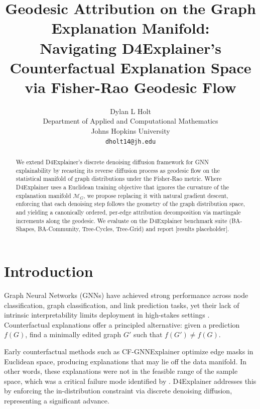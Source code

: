\documentclass[11pt]{article}
\title{Geodesic Attribution on the Graph Explanation Manifold:\\
  Navigating D4Explainer's Counterfactual Explanation Space\\
  via Fisher-Rao Geodesic Flow}
\author{Dylan L Holt\\
  \small Department of Applied and Computational Mathematics\\
  \small Johns Hopkins University\\
  \small \texttt{dholt14@jh.edu}}
\date{}
\newcommand{\MG}{\mathcal{M}_G}
\begin{document}
\maketitle

\begin{abstract}
We extend D4Explainer's discrete denoising diffusion framework for GNN
explainability by recasting its reverse diffusion process as geodesic
flow on the statistical manifold of graph distributions under the
Fisher-Rao metric. Where D4Explainer uses a Euclidean training objective
that ignores the curvature of the explanation manifold $\MG$, we propose
replacing it with natural gradient descent, enforcing that each
denoising step follows the geometry of the graph distribution space,
and yielding a canonically ordered, per-edge attribution decomposition
via martingale increments along the geodesic. We evaluate on the
D4Explainer benchmark suite (BA-Shapes, BA-Community, Tree-Cycles,
Tree-Grid) and report [results placeholder].
\end{abstract}
\setcounter{section}{0}
\section{Introduction}\label{sec:paper}

Graph Neural Networks (GNNs) have achieved strong performance across
node classification, graph classification, and link prediction tasks,
yet their lack of intrinsic interpretability limits deployment in
high-stakes settings .
Counterfactual explanations offer a principled alternative: given a
prediction $f(G)$, find a minimally edited graph $G'$ such that
$f(G') \neq f(G)$.

Early counterfactual methods such as CF-GNNExplainer
 optimize edge masks in Euclidean space,
producing explanations that may lie off the data manifold. In other words, these explanations were not in the feasible range of the sample space, which was
a critical failure mode identified by \citet{doshi2017towards}.
D4Explainer \citep{chen2023d4explainer} addresses this by enforcing
the in-distribution constraint via discrete denoising diffusion,
representing a significant advance.
\end{document}
